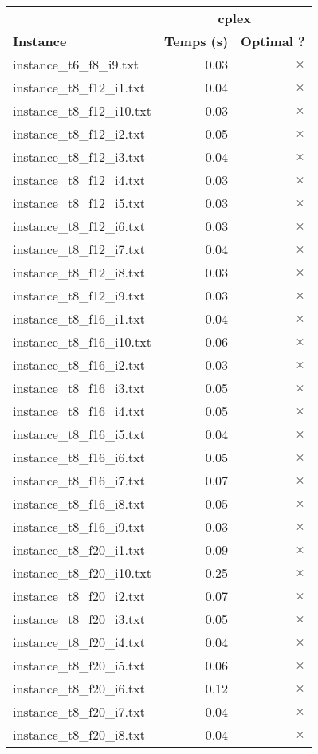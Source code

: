 \documentclass{article}
\begin{document}
\newpage
\begin{center}
\renewcommand{\arraystretch}{1.4} 
\begin{tabular}{lrr}
	\hline
 & \multicolumn{2}{c}{\textbf{cplex}}\\
\textbf{Instance}  & \textbf{Temps (s)} & \textbf{Optimal ?} \\\hline

instance\_t6\_f8\_i9.txt & 0.03 & 
$\times$
\\
instance\_t8\_f12\_i1.txt & 0.04 & 
$\times$
\\
instance\_t8\_f12\_i10.txt & 0.03 & 
$\times$
\\
instance\_t8\_f12\_i2.txt & 0.05 & 
$\times$
\\
instance\_t8\_f12\_i3.txt & 0.04 & 
$\times$
\\
instance\_t8\_f12\_i4.txt & 0.03 & 
$\times$
\\
instance\_t8\_f12\_i5.txt & 0.03 & 
$\times$
\\
instance\_t8\_f12\_i6.txt & 0.03 & 
$\times$
\\
instance\_t8\_f12\_i7.txt & 0.04 & 
$\times$
\\
instance\_t8\_f12\_i8.txt & 0.03 & 
$\times$
\\
instance\_t8\_f12\_i9.txt & 0.03 & 
$\times$
\\
instance\_t8\_f16\_i1.txt & 0.04 & 
$\times$
\\
instance\_t8\_f16\_i10.txt & 0.06 & 
$\times$
\\
instance\_t8\_f16\_i2.txt & 0.03 & 
$\times$
\\
instance\_t8\_f16\_i3.txt & 0.05 & 
$\times$
\\
instance\_t8\_f16\_i4.txt & 0.05 & 
$\times$
\\
instance\_t8\_f16\_i5.txt & 0.04 & 
$\times$
\\
instance\_t8\_f16\_i6.txt & 0.05 & 
$\times$
\\
instance\_t8\_f16\_i7.txt & 0.07 & 
$\times$
\\
instance\_t8\_f16\_i8.txt & 0.05 & 
$\times$
\\
instance\_t8\_f16\_i9.txt & 0.03 & 
$\times$
\\
instance\_t8\_f20\_i1.txt & 0.09 & 
$\times$
\\
instance\_t8\_f20\_i10.txt & 0.25 & 
$\times$
\\
instance\_t8\_f20\_i2.txt & 0.07 & 
$\times$
\\
instance\_t8\_f20\_i3.txt & 0.05 & 
$\times$
\\
instance\_t8\_f20\_i4.txt & 0.04 & 
$\times$
\\
instance\_t8\_f20\_i5.txt & 0.06 & 
$\times$
\\
instance\_t8\_f20\_i6.txt & 0.12 & 
$\times$
\\
instance\_t8\_f20\_i7.txt & 0.04 & 
$\times$
\\
instance\_t8\_f20\_i8.txt & 0.04 & 
$\times$
\\
\hline\end{tabular}
\end{center}
\end{document}
